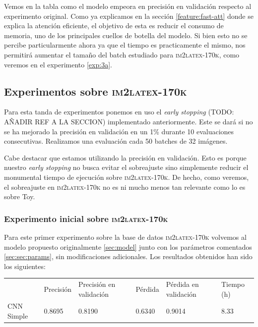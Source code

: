 \documentclass[a4paper, 20pt, dvipsnames]{article}
\begin{document}
Vemos en la tabla como el modelo empeora en precisión en validación respecto al
experimento original. Como ya explicamos en la sección \ref{feature:fast-att}
donde se explica la atención eficiente, el objetivo de esta es reducir el
consumo de memoria, uno de los principales cuellos de botella del modelo. Si
bien esto no se percibe particularmente ahora ya que el tiempo es practicamente
el mismo, nos permitirá aumentar el tamaño del batch estudiado para
\textsc{im2latex-170k}, como veremos en el experimento \ref{exp:3a}.


\subsection{Experimentos sobre \textsc{im2latex-170k}}

Para esta tanda de experimentos ponemos en uso el \emph{early stopping} (TODO: AÑADIR REF
A LA SECCION) implementado anteriormente. Este se dará si no se ha mejorado la precisión
en validación en un 1\% durante 10 evaluaciones consecutivas. Realizamos una evaluación
cada 50 batches de 32 imágenes.

Cabe destacar que estamos utilizando la precisión en validación. Esto es porque nuestro
\emph{early stopping} no busca evitar el sobreajuste sino simplemente reducir el
monumental tiempo de ejecución sobre \textsc{im2latex-170k}. De hecho, como veremos, el sobreajuste en
\textsc{im2latex-170k} no es ni mucho menos tan relevante como lo es sobre Toy.

\subsubsection{Experimento inicial sobre \textsc{im2latex-170k}}
\label{exp:1}

Para este primer experimento sobre la base de datos \textsc{im2latex-170k}
volvemos al modelo propuesto originalmente \ref{sec:model} junto con los
parámetros comentados \ref{sec:sec:params}, sin modificaciones adicionales. Los
resultados obtenidos han sido los siguientes:

\begin{table}[H]
	\centering
	\begin{tabular}{llllll}
		& Precisión & Precisión en validación & Pérdida & Pérdida en validación & Tiempo (h) \\ \cline{2-6} 
		CNN Simple & 0.8695    & 0.8190                  & 0.6340  & 0.9014                & 8.33      
	\end{tabular}
\end{table}
\end{document}
